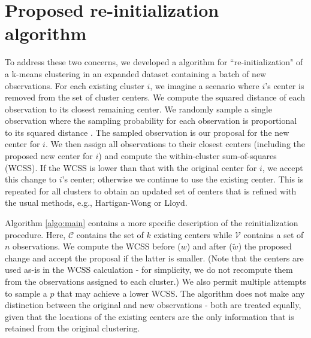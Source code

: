 \documentclass{article}
\begin{document}
\section{Proposed re-initialization algorithm}

To address these two concerns, we developed a algorithm for ``re-initialization" of a k-means clustering in an expanded dataset containing a batch of new observations.
For each existing cluster $i$, we imagine a scenario where $i$'s center is removed from the set of cluster centers.
We compute the squared distance of each observation to its closest remaining center.
We randomly sample a single observation where the sampling probability for each observation is proportional to its squared distance \cite{vassilvitskii2006kmeanspp}.
The sampled observation is our proposal for the new center for $i$.
We then assign all observations to their closest centers (including the proposed new center for $i$) and compute the within-cluster sum-of-squares (WCSS).
If the WCSS is lower than that with the original center for $i$, we accept this change to $i$'s center; otherwise we continue to use the existing center.
This is repeated for all clusters to obtain an updated set of centers that is refined with the usual methods, e.g., Hartigan-Wong \cite{hartigan1979algorithm} or Lloyd.

Algorithm \ref{algo:main} contains a more specific description of the reinitialization procedure.
Here, $\mathcal{C}$ contains the set of $k$ existing centers while $\mathcal{V}$ contains a set of $n$ observations.
We compute the WCSS before ($w$) and after ($\tilde{w}$) the proposed change and accept the proposal if the latter is smaller.
(Note that the centers are used as-is in the WCSS calculation - for simplicity, we do not recompute them from the observations assigned to each cluster.)
We also permit multiple attempts to sample a $p$ that may achieve a lower WCSS.
The algorithm does not make any distinction between the original and new observations - 
both are treated equally, given that the locations of the existing centers are the only information that is retained from the original clustering. 

\renewcommand{\algorithmicrequire}{\textbf{Input:}}
\renewcommand{\algorithmicensure}{\textbf{Output:}}
\end{document}
